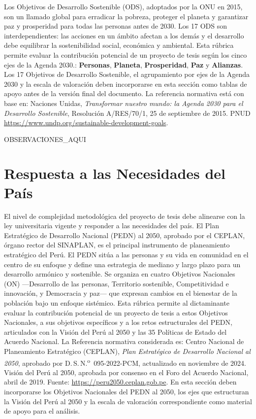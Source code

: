 \documentclass[12pt,a4paper]{report}
\begin{document}
Los Objetivos de Desarrollo Sostenible (ODS), adoptados por la ONU en 2015, son un llamado global para erradicar la pobreza, proteger el planeta y garantizar paz y prosperidad para todas las personas antes de 2030. Los 17 ODS son interdependientes: las acciones en un ámbito afectan a los demás y el desarrollo debe equilibrar la sostenibilidad social, económica y ambiental. Esta rúbrica permite evaluar la contribución potencial de un proyecto de tesis según los cinco ejes de la Agenda 2030.: \textbf{Personas}, \textbf{Planeta}, \textbf{Prosperidad}, \textbf{Paz} y \textbf{Alianzas}. Los 17 Objetivos de Desarrollo Sostenible, el agrupamiento por ejes de la Agenda 2030 y la escala de valoración deben incorporarse en esta sección como tablas de apoyo antes de la versión final del documento. La referencia normativa está con base en: Naciones Unidas, \textit{Transformar nuestro mundo: la Agenda 2030 para el Desarrollo Sostenible}, Resolución A/RES/70/1, 25 de septiembre de 2015. PNUD \url{https://www.undp.org/sustainable-development-goals}.

{{OBSERVACIONES_AQUI}}


\section{Respuesta a las Necesidades del País}

El nivel de complejidad metodológica del proyecto de tesis debe alinearse con la ley universitaria vigente y responder a las necesidades del país. El Plan Estratégico de Desarrollo Nacional (PEDN) al 2050, aprobado por el CEPLAN, órgano rector del SINAPLAN, es el principal instrumento de planeamiento estratégico del Perú. El PEDN sitúa a las personas y su vida en comunidad en el centro de su enfoque y define una estrategia de mediano y largo plazo para un desarrollo armónico y sostenible. Se organiza en cuatro Objetivos Nacionales (ON) —Desarrollo de las personas, Territorio sostenible, Competitividad e innovación, y Democracia y paz— que expresan cambios en el bienestar de la población bajo un enfoque sistémico. Esta rúbrica permite al dictaminante evaluar la contribución potencial de un proyecto de tesis a estos Objetivos Nacionales, a sus objetivos específicos y a los retos estructurales del PEDN, articulados con la Visión del Perú al 2050 y las 35 Políticas de Estado del Acuerdo Nacional. La Referencia normativa considerada es: Centro Nacional de Planeamiento Estratégico (CEPLAN), \textit{Plan Estratégico de Desarrollo Nacional al 2050}, aprobado por D.\,S.\,N.\textsuperscript{o}~095-2022-PCM, actualizado en noviembre de 2024. Visión del Perú al 2050, aprobada por consenso en el Foro del Acuerdo Nacional, abril de 2019. Fuente: \url{https://peru2050.ceplan.gob.pe}. En esta sección deben incorporarse los Objetivos Nacionales del PEDN al 2050, los ejes que estructuran la Visión del Perú al 2050 y la escala de valoración correspondiente como material de apoyo para el análisis.
\end{document}
